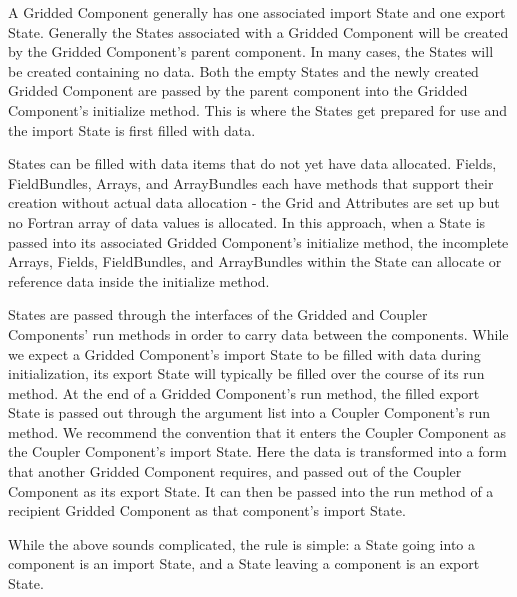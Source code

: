%

A Gridded Component generally has one associated import 
State and one export State.  Generally the States 
associated with a Gridded Component will be created by 
the Gridded Component's parent component.
In many cases, the States will be created containing 
no data.  Both the empty States and the
newly created Gridded Component are passed
by the parent component into the Gridded Component's initialize 
method.  This is where the States get prepared for use 
and the import State is first filled with data.

States can be filled with data items that do not yet 
have data allocated.  Fields, FieldBundles, Arrays, and ArrayBundles each have 
methods that support their creation without actual data 
allocation - the Grid and Attributes are set up but no
Fortran array of data values is allocated.  In this approach, 
when a State is passed into its associated Gridded Component's 
initialize method, the incomplete Arrays, Fields, FieldBundles,
and ArrayBundles within the State can allocate or reference data 
inside the initialize method.

States are passed through the interfaces of the Gridded 
and Coupler Components' run methods in order to carry data 
between the components.  While we expect
a Gridded Component's import State to be filled with data 
during initialization, its export State will typically be
filled over the course of its run method.  At the end of
a Gridded Component's run method, the filled export State 
is passed out through the argument list into a Coupler 
Component's run method.  We recommend the convention that 
it enters the Coupler Component as the Coupler Component's
import State.  Here the data is transformed into a form
that another Gridded Component requires, and passed out
of the Coupler Component as its export State.  It can then
be passed into the run method of a recipient Gridded Component
as that component's import State.

While the above sounds complicated, the rule is simple:
a State going into a component is an import State, and a 
State leaving a component is an export State.

